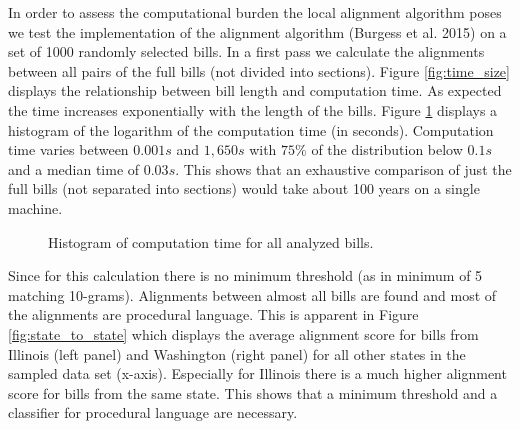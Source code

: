 \documentclass[12pt]{article} %
\begin{document}
In order to assess the computational burden the local alignment algorithm poses we test the implementation of the alignment algorithm (Burgess et al. 2015) on a set of 1000 randomly selected bills. In a first pass we calculate the alignments  between all pairs of the full bills (not divided into sections). Figure \ref{fig:time_size} displays the relationship between bill length and computation time. As expected the time increases exponentially with the length of the bills. Figure \ref{fig:time} displays a histogram of the logarithm of the computation time (in seconds). Computation time varies between $0.001s$ and $1,650s$ with $75\%$ of the distribution below $0.1s$ and a median time of $0.03s$.  This shows that an exhaustive comparison of just the full bills (not separated into sections) would take about 100 years on a single machine.

\begin{figure}[ht!]
\caption{Histogram of computation time for all analyzed bills.}
\label{fig:time} 
\end{figure}

Since for this calculation there is no minimum threshold (as in \citet{wilkerson2015tracing} minimum of 5 matching 10-grams). Alignments between almost all bills are found and most of the alignments are procedural language. This is apparent in Figure \ref{fig:state_to_state} which displays the average alignment score for bills from Illinois (left panel) and Washington (right panel) for all other states in the sampled data set (x-axis). Especially for Illinois there is a much higher alignment score for bills from the same state. This shows that a minimum threshold and a classifier for procedural language are necessary.
\end{document}
